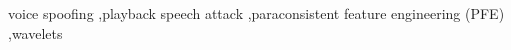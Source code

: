 voice spoofing \sep playback speech attack \sep paraconsistent feature engineering (PFE) \sep wavelets 